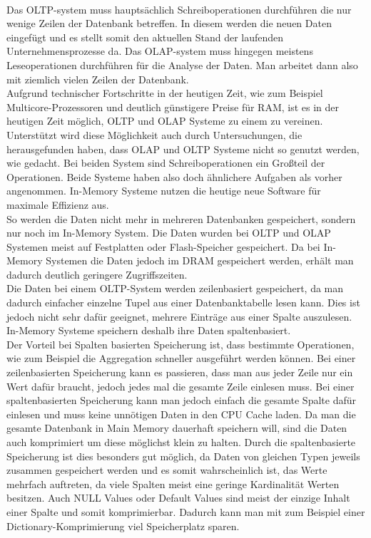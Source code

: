 \\
Das OLTP-system muss hauptsächlich Schreiboperationen durchführen die nur wenige Zeilen der Datenbank betreffen. In diesem werden die neuen Daten eingefügt und es stellt somit den aktuellen Stand der laufenden Unternehmensprozesse da. Das OLAP-system muss hingegen meistens Leseoperationen durchführen für die Analyse der Daten. Man arbeitet dann also mit ziemlich vielen Zeilen der Datenbank.
\\
Aufgrund technischer Fortschritte in der heutigen Zeit, wie zum Beispiel Multicore-Prozessoren und deutlich günstigere Preise für RAM,
ist es in der heutigen Zeit möglich, OLTP und OLAP Systeme zu einem zu vereinen.
Unterstützt wird diese Möglichkeit auch durch Untersuchungen, die herausgefunden haben, dass OLAP und OLTP Systeme nicht so genutzt werden, wie gedacht. Bei beiden System sind Schreiboperationen ein Großteil der Operationen. Beide Systeme haben also doch ähnlichere Aufgaben als vorher angenommen. In-Memory Systeme nutzen die heutige neue Software für maximale Effizienz aus.
\\
So werden die Daten nicht mehr in mehreren Datenbanken gespeichert, sondern nur noch im In-Memory System. Die Daten wurden bei OLTP und OLAP Systemen meist auf Festplatten oder Flash-Speicher gespeichert. Da bei In-Memory Systemen die Daten jedoch im DRAM gespeichert werden, erhält man dadurch deutlich geringere Zugriffszeiten.
\\
Die Daten bei einem OLTP-System werden zeilenbasiert gespeichert, da man dadurch einfacher einzelne Tupel aus einer Datenbanktabelle lesen kann. Dies ist jedoch nicht sehr dafür geeignet, mehrere Einträge aus einer Spalte auszulesen.
In-Memory Systeme speichern deshalb ihre Daten spaltenbasiert.
\\
Der Vorteil bei Spalten basierten Speicherung ist, dass bestimmte Operationen, wie zum Beispiel die Aggregation schneller ausgeführt werden können. Bei einer zeilenbasierten Speicherung kann es passieren, dass man aus jeder Zeile nur ein Wert dafür braucht, jedoch jedes mal die gesamte Zeile einlesen muss. Bei einer spaltenbasierten Speicherung kann man jedoch einfach die gesamte Spalte dafür einlesen und muss keine unnötigen Daten in den CPU Cache laden.
Da man die gesamte Datenbank in Main Memory dauerhaft speichern will, sind die Daten auch komprimiert um diese möglichst klein zu halten.
Durch die spaltenbasierte Speicherung ist dies besonders gut möglich, da Daten von gleichen Typen jeweils zusammen gespeichert werden und es somit wahrscheinlich ist, das Werte mehrfach auftreten, da viele Spalten meist eine geringe Kardinalität Werten besitzen. Auch NULL Values oder Default Values sind meist der einzige Inhalt einer Spalte und somit komprimierbar. Dadurch kann man mit zum Beispiel einer Dictionary-Komprimierung viel Speicherplatz sparen.
